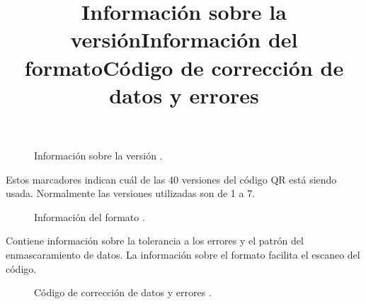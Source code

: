 \title{Información sobre la versión}

\begin{figure}[htbp]
	\begin{center}
		\caption{Información sobre la versión \cite{CitaA01}.}
		\label{fig:version}
	\end{center}
\end{figure}

Estos marcadores indican cuál de las 40 versiones del código QR está siendo usada. Normalmente las versiones utilizadas son de 1 a 7. \cite{CitaA01}\\

\title{Información del formato}

\begin{figure}[htbp]
	\begin{center}
		\caption{Información del formato \cite{CitaA01}.}
		\label{fig:formato2}
	\end{center}
\end{figure}

Contiene información sobre la tolerancia a los errores y el patrón del enmascaramiento de datos. La información sobre el formato facilita el escaneo del código. \cite{CitaA01}\\

\newpage
\title{Código de corrección de datos y errores}

\begin{figure}[htbp]
	\begin{center}
		\caption{Código de corrección de datos y errores \cite{CitaA01}.}
		\label{fig:erroresDatos}
	\end{center}
\end{figure}

